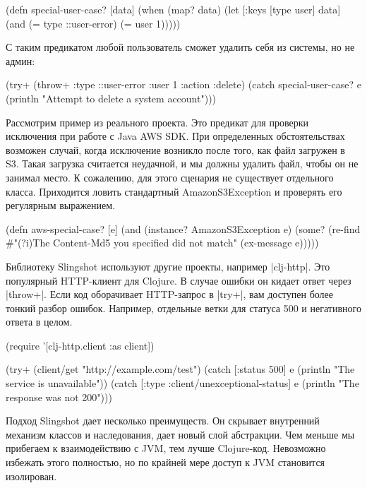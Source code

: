 \begin{code}
(defn special-user-case?
  [data]
  (when (map? data)
    (let [{:keys [type user]} data]
      (and (= type ::user-error)
           (= user 1)))))
\end{code}

С таким предикатом любой пользователь сможет удалить себя из системы, но не
админ:

\begin{code}
(try+
 (throw+ {:type ::user-error
          :user 1
          :action :delete})
 (catch special-user-case? e
   (println "Attempt to delete a system account")))
\end{code}

Рассмотрим пример из реального проекта. Это предикат для проверки исключения при
работе с Java AWS SDK. При определенных обстоятельствах возможен случай, когда
исключение возникло после того, как файл загружен в S3. Такая загрузка считается
неудачной, и мы должны удалить файл, чтобы он не занимал место. К сожалению, для
этого сценария не существует отдельного класса. Приходится ловить стандартный
AmazonS3Exception и проверять его регулярным выражением.

\begin{code}
(defn aws-special-case?
  [e]
  (and
   (instance? AmazonS3Exception e)
   (some?
    (re-find
     #"(?i)The Content-Md5 you specified did not match"
     (ex-message e)))))
\end{code}

Библиотеку Slingshot используют другие проекты, например \spverb|clj-http|. Это
популярный HTTP-клиент для Clojure. В случае ошибки он кидает ответ через
\spverb|throw+|. Если код оборачивает HTTP-запрос в \spverb|try+|, вам доступен более тонкий
разбор ошибок. Например, отдельные ветки для статуса 500 и негативного ответа в
целом.

\begin{code}
(require '[clj-http.client :as client])

(try+
 (client/get "http://example.com/test")
 (catch [:status 500] e
   (println "The service is unavailable"))
 (catch [:type :client/unexceptional-status] e
   (println "The response was not 200")))
\end{code}

Подход Slingshot дает несколько преимуществ. Он скрывает внутренний механизм
классов и наследования, дает новый слой абстракции. Чем меньше мы прибегаем к
взаимодействию с JVM, тем лучше Clojure-код. Невозможно избежать этого
полностью, но по крайней мере доступ к JVM становится изолирован.

